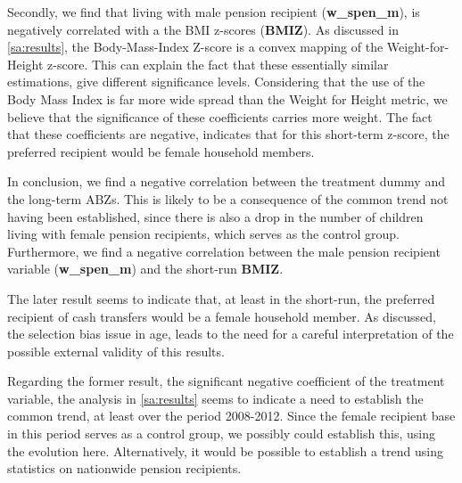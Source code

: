 \begin{refsection}
Secondly, we find that living with male pension recipient (\textbf{w\_spen\_m}),
is negatively correlated with a the BMI z-scores (\textbf{BMIZ}).
As discussed in \autoref{sa:results}, the Body-Mass-Index Z-score is a convex mapping of the Weight-for-Height z-score.
This can explain the fact that these essentially similar estimations, give different significance levels.
Considering that the use of the Body Mass Index is far more wide spread than the Weight for Height metric,
we believe that the significance of these coefficients carries more weight.
The fact that these coefficients are negative, indicates that for this short-term z-score,
the preferred recipient would be female household members.

In conclusion, we find a negative correlation between the treatment dummy and the long-term ABZs.
This is likely to be a consequence of the common trend not having been established,
since there is also a drop in the number of children living with female pension recipients, which serves as the control group.
Furthermore, we find a negative correlation between the male pension recipient variable (\textbf{w\_spen\_m}) and the short-run \textbf{BMIZ}.

The later result seems to indicate that, at least in the short-run,
the preferred recipient of cash transfers would be a female household member.
As discussed, the selection bias issue in age,
leads to the need for a careful interpretation of the possible external validity of this results.

Regarding the former result, the significant negative coefficient of the treatment variable,
the analysis in \autoref{sa:results} seems to indicate a need to establish the common trend,
at least over the period 2008-2012.
Since the female recipient base in this period serves as a control group, we possibly could establish this, using the evolution here.
Alternatively, it would be possible to establish a trend using statistics on nationwide pension recipients.

\printbibliography
\end{refsection}

